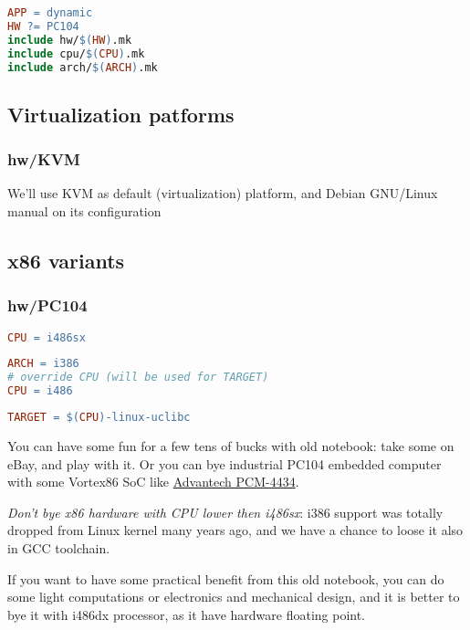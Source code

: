\begin{lstlisting}[language=make,title=Makefile]
APP = dynamic
HW ?= PC104
include hw/$(HW).mk
include cpu/$(CPU).mk
include arch/$(ARCH).mk
\end{lstlisting}

\subsection{Virtualization patforms}

\subsubsection{hw/KVM}

We'll use KVM as default (virtualization) platform, and Debian GNU/Linux manual
on its configuration

\subsection{x86 variants}

\subsubsection{hw/PC104}

\begin{lstlisting}[language=make,title=hw/PC104]
CPU = i486sx
\end{lstlisting}
\begin{lstlisting}[language=make,title=cpu/i486sx]
ARCH = i386
# override CPU (will be used for TARGET)
CPU = i486
\end{lstlisting}
\begin{lstlisting}[language=make,title=arch/i386]
TARGET = $(CPU)-linux-uclibc
\end{lstlisting}

You can have some fun for a few tens of bucks with old notebook: take some on
eBay, and play with it. Or you can bye industrial PC104 embedded computer with
some Vortex86 SoC like
\href{http://www.advantech.ru/products/1-2jkltu/pcm-3343/mod_645a1e17-167a-4476-b253-ca4cf2e19428}{Advantech PCM-4434}.

\emph{Don't bye x86 hardware with CPU lower then i486sx}: i386 support was
totally dropped from Linux kernel many years ago, and we have a chance to loose
it also in GCC toolchain.

If you want to have some practical benefit from this old notebook, you can do
some light computations or electronics and mechanical design, and it is better
to bye it with i486dx processor, as it have hardware floating point. 

